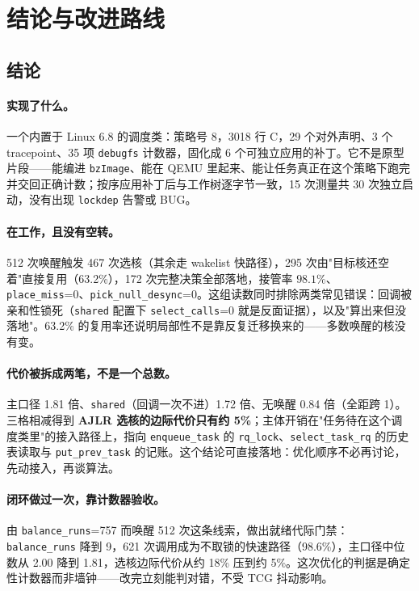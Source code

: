 
\section{结论与改进路线} \label{sec:conclusion}

\subsection{结论}

\paragraph{实现了什么。}一个内置于 Linux 6.8 的调度类：策略号 8，3018 行 C，29 个对外声明、3 个 tracepoint、35 项 \texttt{debugfs} 计数器，固化成 6 个可独立应用的补丁。它不是原型片段——能编进 \texttt{bzImage}、能在 QEMU 里起来、能让任务真正在这个策略下跑完并交回正确计数；按序应用补丁后与工作树逐字节一致，15 次测量共 30 次独立启动，没有出现 \texttt{lockdep} 告警或 BUG。

\paragraph{在工作，且没有空转。}512 次唤醒触发 467 次选核（其余走 wakelist 快路径），295 次由"目标核还空着"直接复用（63.2\%），172 次完整决策全部落地，接管率 $98.1\%$、\texttt{place\_miss}=0、\texttt{pick\_null\_desync}=0。这组读数同时排除两类常见错误：回调被亲和性锁死（\texttt{shared} 配置下 \texttt{select\_calls}=0 就是反面证据），以及"算出来但没落地"。63.2\% 的复用率还说明局部性不是靠反复迁移换来的——多数唤醒的核没有变。

\paragraph{代价被拆成两笔，不是一个总数。}主口径 1.81 倍、\texttt{shared}（回调一次不进）1.72 倍、无唤醒 0.84 倍（全距跨 1）。三格相减得到 \textbf{AJLR 选核的边际代价只有约 5\%}；主体开销在"任务待在这个调度类里"的接入路径上，指向 \texttt{enqueue\_task} 的 \texttt{rq\_lock}、\texttt{select\_task\_rq} 的历史表读取与 \texttt{put\_prev\_task} 的记账。这个结论可直接落地：优化顺序不必再讨论，先动接入，再谈算法。

\paragraph{闭环做过一次，靠计数器验收。}由 \texttt{balance\_runs}=757 而唤醒 512 次这条线索，做出就绪代际门禁：\texttt{balance\_runs} 降到 9，621 次调用成为不取锁的快速路径（98.6\%），主口径中位数从 2.00 降到 1.81，选核边际代价从约 18\% 压到约 5\%。这次优化的判据是确定性计数器而非墙钟——改完立刻能判对错，不受 TCG 抖动影响。

